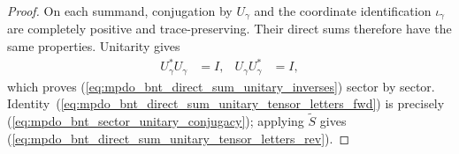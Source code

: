 \begin{proof}\leanok

    On each summand, conjugation by $U_\gamma$ and the coordinate
    identification $\iota_\gamma$ are completely positive and
    trace-preserving.  Their direct sums therefore have the same properties.
    Unitarity gives
    \begin{align}
        U_\gamma^*U_\gamma
         & =I,
         &
        U_\gamma U_\gamma^*
         & =I,
    \end{align}
    which proves (\ref{eq:mpdo_bnt_direct_sum_unitary_inverses}) sector by
    sector.  Identity~(\ref{eq:mpdo_bnt_direct_sum_unitary_tensor_letters_fwd}) is precisely
    (\ref{eq:mpdo_bnt_sector_unitary_conjugacy}); applying $\widetilde S$ gives
    (\ref{eq:mpdo_bnt_direct_sum_unitary_tensor_letters_rev}).
\end{proof}
